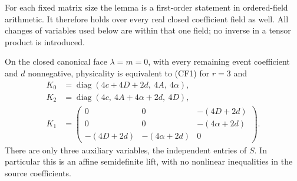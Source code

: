 For each fixed matrix size the lemma is a first-order statement in
ordered-field arithmetic. It therefore holds over every real closed
coefficient field as well. All changes of variables used below are
within that one field; no inverse in a tensor product is introduced.

\begin{theorem}
\label{pd9a6195f0af3:thm:closed-face-adjacent}
On the closed canonical face $\lambda=m=0$, with every remaining
event coefficient and $d$ nonnegative, physicality is equivalent to
(CF1) for $r=3$ and
\begin{align*}
 K_0&=\operatorname{diag}(4c+4D+2d,\ 4A,\ 4\alpha),\\
 K_2&=\operatorname{diag}(4c,\ 4A+4\alpha+2d,\ 4D),\\
 K_1&=\begin{pmatrix}
 0&0&-(4D+2d)\\
 0&0&-(4\alpha+2d)\\
 -(4D+2d)&-(4\alpha+2d)&0
 \end{pmatrix}.                                           \tag{CF4}
\end{align*}
There are only three auxiliary variables, the independent entries of
$S$. In particular this is an affine semidefinite lift, with no
nonlinear inequalities in the source coefficients.
\end{theorem}
